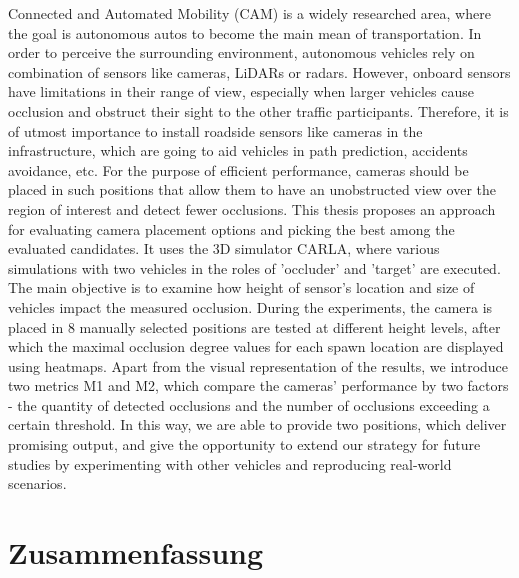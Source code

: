 Connected and Automated Mobility (CAM) is a widely researched area, where the goal is autonomous autos to become the main mean of transportation. In order to perceive the surrounding environment, autonomous vehicles rely on combination of sensors like cameras, LiDARs or radars. However, onboard sensors have limitations in their range of view, especially when larger vehicles cause occlusion and obstruct their sight to the other traffic participants. Therefore, it is of utmost importance to install roadside sensors like cameras in the infrastructure, which are going to aid vehicles in path prediction, accidents avoidance, etc. For the purpose of efficient performance, cameras should be placed in such positions that allow them to have an unobstructed view over the region of interest and detect fewer occlusions. This thesis proposes an approach for evaluating camera placement options and picking the best among the evaluated candidates. It uses the 3D simulator CARLA, where various simulations with two vehicles in the roles of 'occluder' and 'target' are executed. The main objective is to examine how height of sensor's location and size of vehicles impact the measured occlusion. During the experiments, the camera is placed in 8 manually selected positions are tested at different height levels, after which the maximal occlusion degree values for each spawn location are displayed using heatmaps. Apart from the visual representation of the results, we introduce two metrics M1 and M2, which compare the cameras' performance by two factors - the quantity of detected occlusions and the number of occlusions exceeding a certain threshold. In this way, we are able to provide two positions, which deliver promising output, and give the opportunity to extend our strategy for future studies by experimenting with other vehicles and reproducing real-world scenarios.       


\newpage
\chapter*{Zusammenfassung}

